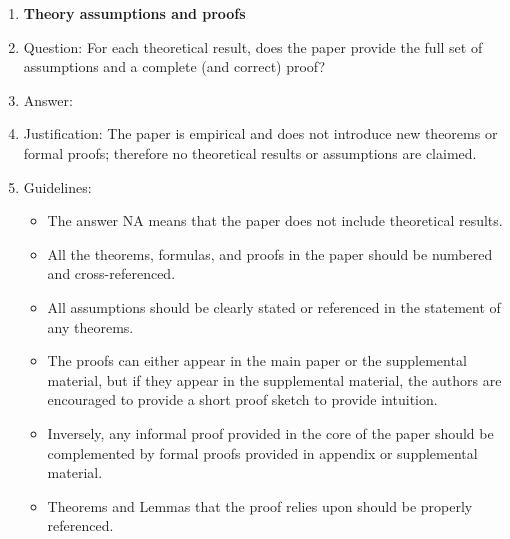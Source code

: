 \documentclass{article}
\begin{document}
\begin{enumerate}
\item {\bf Theory assumptions and proofs}
    \item[] Question: For each theoretical result, does the paper provide the full set of assumptions and a complete (and correct) proof?
    \item[] Answer: \answerNA{}
    \item[] Justification: The paper is empirical and does not introduce new theorems or formal proofs; therefore no theoretical results or assumptions are claimed.
    \item[] Guidelines:
    \begin{itemize}
        \item The answer NA means that the paper does not include theoretical results. 
        \item All the theorems, formulas, and proofs in the paper should be numbered and cross-referenced.
        \item All assumptions should be clearly stated or referenced in the statement of any theorems.
        \item The proofs can either appear in the main paper or the supplemental material, but if they appear in the supplemental material, the authors are encouraged to provide a short proof sketch to provide intuition. 
        \item Inversely, any informal proof provided in the core of the paper should be complemented by formal proofs provided in appendix or supplemental material.
        \item Theorems and Lemmas that the proof relies upon should be properly referenced. 
    \end{itemize}


\end{enumerate}
\end{document}
